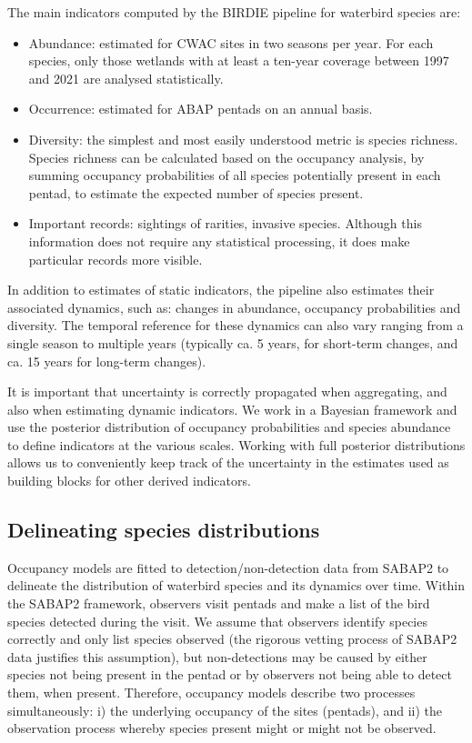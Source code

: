 \documentclass[utf8]{frontiersSCNS}
\begin{document}
The main indicators computed by the BIRDIE pipeline for waterbird
species are:

\begin{itemize}
\item
  Abundance: estimated for CWAC sites in two seasons per year. For each
  species, only those wetlands with at least a ten-year coverage between
  1997 and 2021 are analysed statistically.
\item
  Occurrence: estimated for ABAP pentads on an annual basis.
\item
  Diversity: the simplest and most easily understood metric is species
  richness. Species richness can be calculated based on the occupancy
  analysis, by summing occupancy probabilities of all species
  potentially present in each pentad, to estimate the expected number of
  species present.
\item
  Important records: sightings of rarities, invasive species. Although
  this information does not require any statistical processing, it does
  make particular records more visible.
\end{itemize}

In addition to estimates of static indicators, the pipeline also
estimates their associated dynamics, such as: changes in abundance,
occupancy probabilities and diversity. The temporal reference for these
dynamics can also vary ranging from a single season to multiple years
(typically ca. 5 years, for short-term changes, and ca. 15 years for
long-term changes).

It is important that uncertainty is correctly propagated when
aggregating, and also when estimating dynamic indicators. We work in a
Bayesian framework and use the posterior distribution of occupancy
probabilities and species abundance to define indicators at the various
scales. Working with full posterior distributions allows us to
conveniently keep track of the uncertainty in the estimates used as
building blocks for other derived indicators.

\hypertarget{delineating-species-distributions}{%
\subsection*{Delineating species
distributions}\label{delineating-species-distributions}}

Occupancy models are fitted to detection/non-detection data from SABAP2
to delineate the distribution of waterbird species and its dynamics over
time. Within the SABAP2 framework, observers visit pentads and make a
list of the bird species detected during the visit. We assume that
observers identify species correctly and only list species observed (the
rigorous vetting process of SABAP2 data justifies this assumption), but
non-detections may be caused by either species not being present in the
pentad or by observers not being able to detect them, when present.
Therefore, occupancy models describe two processes simultaneously: i)
the underlying occupancy of the sites (pentads), and ii) the observation
process whereby species present might or might not be observed.
\end{document}
